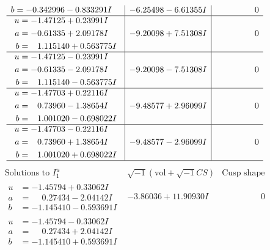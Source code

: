 \documentclass[1p]{elsarticle_modified}
\theoremstyle{definition}
\newcommand{\I}{\sqrt{-1}}
\begin{document}
$$\begin{array}{c|c|c}
\begin{aligned}
b &= -0.342996 - 0.833291 I\end{aligned}
 & -6.25498 - 6.61355 I & \phantom{-0.000000 } 0 \\ \hline\begin{aligned}
u &= -1.47125 + 0.23991 I \\
a &= -0.61335 + 2.09178 I \\
b &= \phantom{-}1.115140 + 0.563775 I\end{aligned}
 & -9.20098 + 7.51308 I & \phantom{-0.000000 } 0 \\ \hline\begin{aligned}
u &= -1.47125 - 0.23991 I \\
a &= -0.61335 - 2.09178 I \\
b &= \phantom{-}1.115140 - 0.563775 I\end{aligned}
 & -9.20098 - 7.51308 I & \phantom{-0.000000 } 0 \\ \hline\begin{aligned}
u &= -1.47703 + 0.22116 I \\
a &= \phantom{-}0.73960 - 1.38654 I \\
b &= \phantom{-}1.001020 - 0.698022 I\end{aligned}
 & -9.48577 + 2.96099 I & \phantom{-0.000000 } 0 \\ \hline\begin{aligned}
u &= -1.47703 - 0.22116 I \\
a &= \phantom{-}0.73960 + 1.38654 I \\
b &= \phantom{-}1.001020 + 0.698022 I\end{aligned}
 & -9.48577 - 2.96099 I & \phantom{-0.000000 } 0\\
 \hline 
 \end{array}$$\newpage$$\begin{array}{c|c|c}  
\text{Solutions to }I^u_{1}& \I (\text{vol} + \sqrt{-1}CS) & \text{Cusp shape}\\
 \hline 
\begin{aligned}
u &= -1.45794 + 0.33062 I \\
a &= \phantom{-}0.27434 - 2.04142 I \\
b &= -1.145410 - 0.593691 I\end{aligned}
 & -3.86036 + 11.90930 I & \phantom{-0.000000 } 0 \\ \hline\begin{aligned}
u &= -1.45794 - 0.33062 I \\
a &= \phantom{-}0.27434 + 2.04142 I \\
b &= -1.145410 + 0.593691 I\end{aligned}

\end{array}$$
\end{document}
